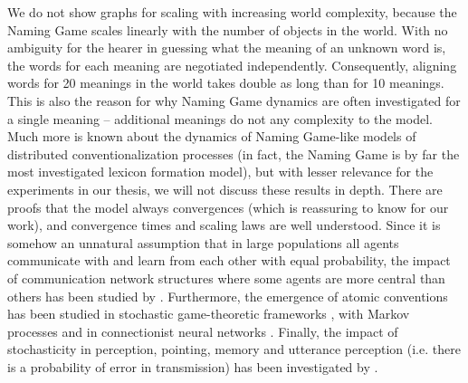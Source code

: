 We do not show graphs for scaling with increasing world complexity,
because the Naming Game scales linearly with the number of objects in
the world. With no ambiguity for the hearer in guessing what the
meaning of an unknown word is, the words for each meaning are
negotiated independently. Consequently, aligning words for 20 meanings
in the world takes double as long than for 10 meanings. This is also
the reason for why Naming Game dynamics are often investigated for a
single meaning -- additional meanings do not any complexity to the
model.\\


\noindent Much more is known about the dynamics of Naming Game-like
models of distributed conventionalization processes (in fact, the
Naming Game is by far the most investigated lexicon formation model),
but with lesser relevance for the experiments in our thesis, we will
not discuss these results in depth. There are proofs that the model
always convergences \citep{devylder06how,ke02complexity} (which is
reassuring to know for our work), and convergence times
\citep{kaplan05simple} and scaling laws \citep{baronchelli06sharp} are
well understood. Since it is somehow an unnatural assumption that in
large populations all agents communicate with and learn from each
other with equal probability, the impact of communication network
structures where some agents are more central than others has been
studied by \cite*{dallasta06nonequilibrium}. Furthermore, the
emergence of atomic conventions has been studied in stochastic
game-theoretic frameworks \citep{shoham97emergence}, with Markov
processes \citep{ke02complexity} and in connectionist neural networks
\citep{hutchins95how}. Finally, the impact of stochasticity in
perception, pointing, memory and utterance perception (i.e. there is a
probability of error in transmission) has been investigated by
\cite{steels98stochasticity}.






